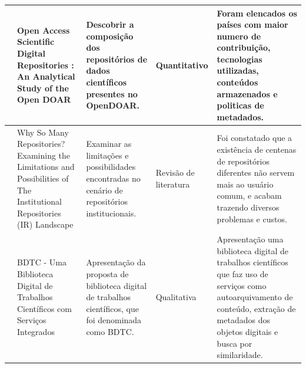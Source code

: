 \begin{landscape}
\begin{table}[H]
{\begin{tabular}{|p{5cm}|p{12cm}|p{12cm}|p{4cm}|p{13cm}|}
                \cite{2018:Mufazil}          & Open Access Scientific Digital Repositories : An Analytical Study of the Open DOAR                                                        & Descobrir a composição dos repositórios de dados científicos presentes no OpenDOAR.                                                                         & Quantitativo                        & Foram elencados os países com maior numero de contribuição, tecnologias utilizadas, conteúdos armazenados e politicas de metadados.                                                          \\ \hline
                \cite{2018:Arlitsch}         & Why So Many Repositories? Examining the Limitations and Possibilities of The Institutional Repositories (IR) Landscape                    & Examinar as limitações e possibilidades encontradas no cenário de repositórios institucionais.                                                              & Revisão de literatura               & Foi constatado que a existência de centenas de repositórios diferentes não servem mais ao usuário comum, e acabam trazendo diversos problemas e custos.                                      \\ \hline
                \cite{2009:Cervi}            & BDTC - Uma Biblioteca Digital de Trabalhos Científicos com Serviços Integrados                                                            & Apresentação da proposta de biblioteca digital de trabalhos científicos, que foi denominada como BDTC.                                                      & Qualitativa                         & Apresentação uma biblioteca digital de trabalhos científicos que faz uso de serviços como autoarquivamento de conteúdo, extração de metadados dos objetos digitais e busca por similaridade. \\ \hline
            \end{tabular}%
        }
    \end{table}
\end{landscape}

